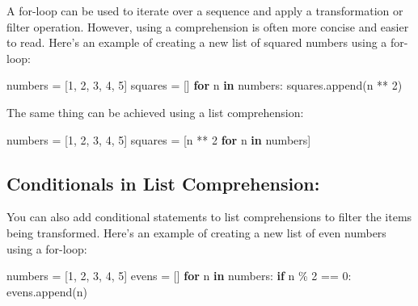 \documentclass[11pt]{article}
\newenvironment{Shaded}{}{}
\newcommand{\KeywordTok}[1]{\textcolor[rgb]{0.00,0.44,0.13}{\textbf{{#1}}}}
\newcommand{\DecValTok}[1]{\textcolor[rgb]{0.25,0.63,0.44}{{#1}}}
\newcommand{\NormalTok}[1]{{#1}}
\newcommand{\ControlFlowTok}[1]{\textcolor[rgb]{0.00,0.44,0.13}{\textbf{{#1}}}}
\newcommand{\OperatorTok}[1]{\textcolor[rgb]{0.40,0.40,0.40}{{#1}}}
\begin{document}
A for-loop can be used to iterate over a sequence and apply a
transformation or filter operation. However, using a comprehension is
often more concise and easier to read. Here's an example of creating a
new list of squared numbers using a for-loop:

\begin{Shaded}
\begin{Highlighting}[]
\NormalTok{numbers }\OperatorTok{=}\NormalTok{ [}\DecValTok{1}\NormalTok{, }\DecValTok{2}\NormalTok{, }\DecValTok{3}\NormalTok{, }\DecValTok{4}\NormalTok{, }\DecValTok{5}\NormalTok{]}
\NormalTok{squares }\OperatorTok{=}\NormalTok{ []}
\ControlFlowTok{for}\NormalTok{ n }\KeywordTok{in}\NormalTok{ numbers:}
\NormalTok{    squares.append(n }\OperatorTok{**} \DecValTok{2}\NormalTok{)}
\end{Highlighting}
\end{Shaded}

The same thing can be achieved using a list comprehension:

\begin{Shaded}
\begin{Highlighting}[]
\NormalTok{numbers }\OperatorTok{=}\NormalTok{ [}\DecValTok{1}\NormalTok{, }\DecValTok{2}\NormalTok{, }\DecValTok{3}\NormalTok{, }\DecValTok{4}\NormalTok{, }\DecValTok{5}\NormalTok{]}
\NormalTok{squares }\OperatorTok{=}\NormalTok{ [n }\OperatorTok{**} \DecValTok{2} \ControlFlowTok{for}\NormalTok{ n }\KeywordTok{in}\NormalTok{ numbers]}
\end{Highlighting}
\end{Shaded}

\hypertarget{conditionals-in-list-comprehension}{%
\subsection{Conditionals in List
Comprehension:}\label{conditionals-in-list-comprehension}}

You can also add conditional statements to list comprehensions to filter
the items being transformed. Here's an example of creating a new list of
even numbers using a for-loop:

\begin{Shaded}
\begin{Highlighting}[]
\NormalTok{numbers }\OperatorTok{=}\NormalTok{ [}\DecValTok{1}\NormalTok{, }\DecValTok{2}\NormalTok{, }\DecValTok{3}\NormalTok{, }\DecValTok{4}\NormalTok{, }\DecValTok{5}\NormalTok{]}
\NormalTok{evens }\OperatorTok{=}\NormalTok{ []}
\ControlFlowTok{for}\NormalTok{ n }\KeywordTok{in}\NormalTok{ numbers:}
    \ControlFlowTok{if}\NormalTok{ n }\OperatorTok{\%} \DecValTok{2} \OperatorTok{==} \DecValTok{0}\NormalTok{:}
\NormalTok{        evens.append(n)}
\end{Highlighting}
\end{Shaded}
\end{document}
